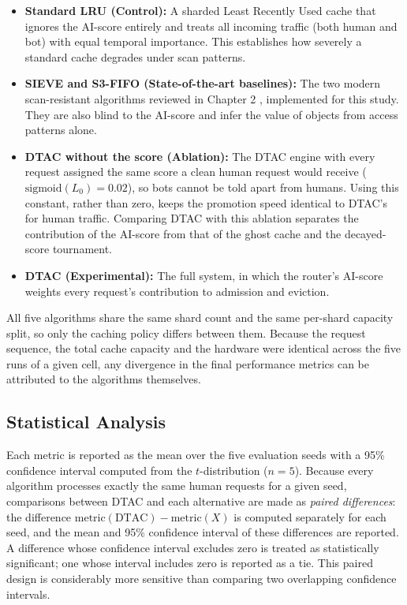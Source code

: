 \begin{itemize}
    \item \textbf{Standard LRU (Control):} A sharded Least Recently Used cache that ignores the AI-score entirely and treats all incoming traffic (both human and bot) with equal temporal importance. This establishes how severely a standard cache degrades under scan patterns.
    \item \textbf{SIEVE and S3-FIFO (State-of-the-art baselines):} The two modern scan-resistant algorithms reviewed in Chapter 2 \cite{zhang_sieve_2024, yang_fifo_2023}, implemented for this study. They are also blind to the AI-score and infer the value of objects from access patterns alone.
    \item \textbf{DTAC without the score (Ablation):} The DTAC engine with every request assigned the same score a clean human request would receive ($\text{sigmoid}(L_0) = 0.02$), so bots cannot be told apart from humans. Using this constant, rather than zero, keeps the promotion speed identical to DTAC's for human traffic. Comparing DTAC with this ablation separates the contribution of the AI-score from that of the ghost cache and the decayed-score tournament.
    \item \textbf{DTAC (Experimental):} The full system, in which the router's AI-score weights every request's contribution to admission and eviction.
\end{itemize}

All five algorithms share the same shard count and the same per-shard capacity split, so only the caching policy differs between them. Because the request sequence, the total cache capacity and the hardware were identical across the five runs of a given cell, any divergence in the final performance metrics can be attributed to the algorithms themselves.

\subsection{Statistical Analysis}
Each metric is reported as the mean over the five evaluation seeds with a 95\% confidence interval computed from the $t$-distribution ($n = 5$). Because every algorithm processes exactly the same human requests for a given seed, comparisons between DTAC and each alternative are made as \emph{paired differences}: the difference $\text{metric}(\text{DTAC}) - \text{metric}(X)$ is computed separately for each seed, and the mean and 95\% confidence interval of these differences are reported. A difference whose confidence interval excludes zero is treated as statistically significant; one whose interval includes zero is reported as a tie. This paired design is considerably more sensitive than comparing two overlapping confidence intervals.

